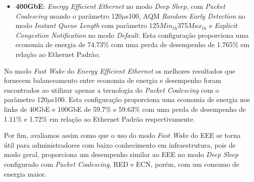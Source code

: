 \begin{itemize}
\item \textbf{400GbE}: \emph{Energy Efficient Ethernet} no modo \emph{Deep Sleep}, com \emph{Packet Coalescing} usando o parâmetro 120$\mu$s100, AQM \emph{Random Early Detection} no modo \emph{Instant Queue Length} com parâmetro 125{$\mathit{Min}_\mathit{th}$}375{$\mathit{Max}_\mathit{th}$} e \emph{Explicit Congestion Notification} no modo \emph{Default}. Esta configuração proporciona uma economia de energia de 74.73\% com uma perda de desempenho de 1.765\% em relação ao Ethernet Padrão;


\end{itemize}

No modo \emph{Fast Wake} do \emph{Energy Efficient Ethernet} os melhores resultados que fornecem balanceamento entre economia de energia e desempenho foram encontrados ao utilizar apenas a tecnologia do \emph{Packet Coalescing} com o parâmetro 120$\mu$s100. Esta configuração proporciona uma economia de energia nos links de 40GbE e 100GbE de 59.7\% e 59.63\% com uma perda de desempenho de 1.11\% e 1.72\% em relação ao Ethernet Padrão respectivamente.

Por fim, avaliamos assim como \cite{herreria2017optimizing} que o uso do modo \emph{Fast Wake} do EEE se torna útil para administradores com baixo conhecimento em infraestrutura, pois de modo geral, proporciona um desempenho similar ao EEE no modo \emph{Deep Sleep} configurado com \emph{Packet Coalescing}, RED e ECN, porém, com um consumo de energia maior.
